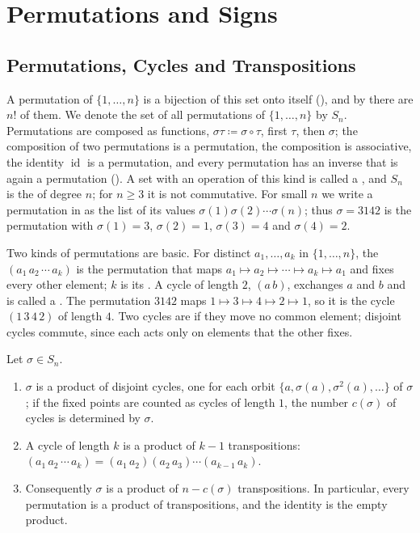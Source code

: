 \section{Permutations and Signs}
\label{sec:permutations-signs}

\subsection{Permutations, Cycles and Transpositions}

A permutation of $\{1,\ldots,n\}$ is a bijection of this set onto itself (), and by  there are $n!$ of them. We denote the set of all permutations of $\{1,\ldots,n\}$ by $S_n$. Permutations are composed as functions, $\sigma\tau\coloneqq\sigma\circ\tau$, first $\tau$, then $\sigma$; the composition of two permutations is a permutation, the composition is associative, the identity $\operatorname{id}$ is a permutation, and every permutation has an inverse that is again a permutation (). A set with an operation of this kind is called a , and $S_n$ is the  of degree $n$; for $n\ge3$ it is not commutative. For small $n$ we write a permutation in  as the list of its values $\sigma(1)\sigma(2)\cdots\sigma(n)$; thus $\sigma=3142$ is the permutation with $\sigma(1)=3$, $\sigma(2)=1$, $\sigma(3)=4$ and $\sigma(4)=2$.

Two kinds of permutations are basic. For distinct $a_1,\ldots,a_k$ in $\{1,\ldots,n\}$, the  $(a_1\,a_2\,\cdots\,a_k)$ is the permutation that maps $a_1\mapsto a_2\mapsto\cdots\mapsto a_k\mapsto a_1$ and fixes every other element; $k$ is its . A cycle of length $2$, $(a\,b)$, exchanges $a$ and $b$ and is called a . The permutation $3142$ maps $1\mapsto3\mapsto4\mapsto2\mapsto1$, so it is the cycle $(1\,3\,4\,2)$ of length $4$. Two cycles are  if they move no common element; disjoint cycles commute, since each acts only on elements that the other fixes.

\begin{proposition}
\label{prop:cycles}
Let $\sigma\in S_n$.
\begin{enumerate}
\item $\sigma$ is a product of disjoint cycles, one for each orbit $\{a,\sigma(a),\sigma^2(a),\ldots\}$ of $\sigma$; if the fixed points are counted as cycles of length $1$, the number $c(\sigma)$ of cycles is determined by $\sigma$.
\item A cycle of length $k$ is a product of $k-1$ transpositions: $(a_1\,a_2\,\cdots\,a_k)=(a_1\,a_2)(a_2\,a_3)\cdots(a_{k-1}\,a_k)$.
\item Consequently $\sigma$ is a product of $n-c(\sigma)$ transpositions. In particular, every permutation is a product of transpositions, and the identity is the empty product.
\end{enumerate}
\end{proposition}

